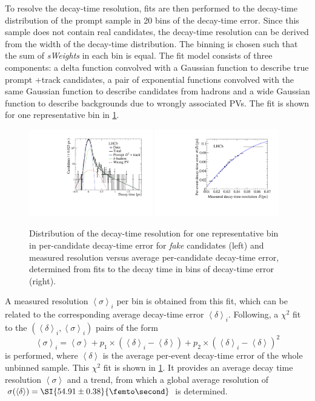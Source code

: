 To resolve the decay-time resolution, fits are then performed to the decay-time distribution of the prompt sample in \num{20} bins of the decay-time error.
Since this sample does not contain real \Bz candidates, the decay-time resolution can be derived from the width of the decay-time distribution.
The binning is chosen such that the sum of \emph{sWeights} in each bin is equal.
The fit model consists of three components: a delta function convolved with a Gaussian function to describe true prompt \Dpm+track candidates, a pair of exponential functions convolved with the same Gaussian function to describe candidates from \bquark hadrons and a wide Gaussian function to describe backgrounds due to wrongly associated \ac{PV}s.
The fit is shown for one representative bin in \cref{fig:resolutionRepresentativeBin}.
\begin{figure}[tbp]
    \centering
    \includegraphics[width=0.48\textwidth]{10TimeFit/figs/resolution_Bin15.pdf}
    \includegraphics[width=0.48\textwidth]{10TimeFit/figs/resolution_chi2Fit.pdf}
    \caption{Distribution of the decay-time resolution for one representative bin in per-candidate decay-time error for \emph{fake} \Bz candidates (left) and measured resolution versus average per-candidate decay-time error, determined from fits to the decay time in bins of decay-time error (right).}
    \label{fig:resolutionRepresentativeBin}
\end{figure}
A measured resolution $\left<\sigma\right>_i$ per bin is obtained from this fit, which can be related to the corresponding average decay-time error $\left<\delta\right>_i$.
Following, a $\chi^2$ fit to the $(\left<\delta\right>_i, \left<\sigma\right>_i)$ pairs of the form
\begin{equation}
\left<\sigma\right>_i=\left<\sigma\right>+p_1\times\left(\left<\delta\right>_i-\left<\delta\right>\right)+p_2\times\left(\left<\delta\right>_i-\left<\delta\right>\right)^2
\end{equation}
is performed, where $\left<\delta\right>$ is the average per-event decay-time error of the whole unbinned sample.
This $\chi^2$ fit is shown in \cref{fig:resolutionRepresentativeBin}.
It provides an average decay time resolution $\left<\sigma\right>$ and a trend, from which a global average resolution of \mbox{$\sigma\!\left(\left<\delta\right>\right)=\SI{54.91\pm0.38}{\femto\second}$} is determined.

